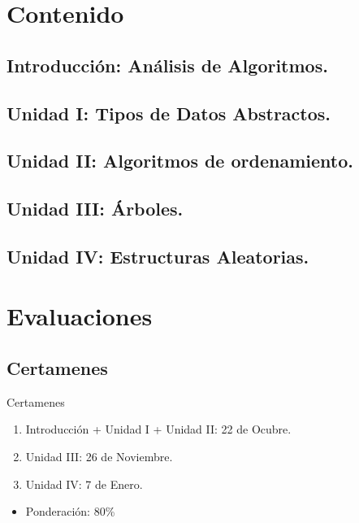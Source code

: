 \documentclass{beamer} %
\begin{document}

\section{Contenido}

\subsection{Introducción: Análisis de Algoritmos.}
\subsection{Unidad I: Tipos de Datos Abstractos.}
\subsection{Unidad II: Algoritmos de ordenamiento.}
\subsection{Unidad III: Árboles.}
\subsection{Unidad IV: Estructuras Aleatorias.}

\section{Evaluaciones}

\subsection{Certamenes}
\begin{frame}
  \begin{block}{Certamenes}
  \begin{enumerate}
    \item Introducción + Unidad I + Unidad II: 22 de Ocubre.
    \item Unidad III: 26 de Noviembre.
    \item Unidad IV: 7 de Enero.
  \end{enumerate}
  \begin{itemize}
    \item Ponderación: 80\%
  \end{itemize}

\end{block}
\end{frame}
\end{document}
